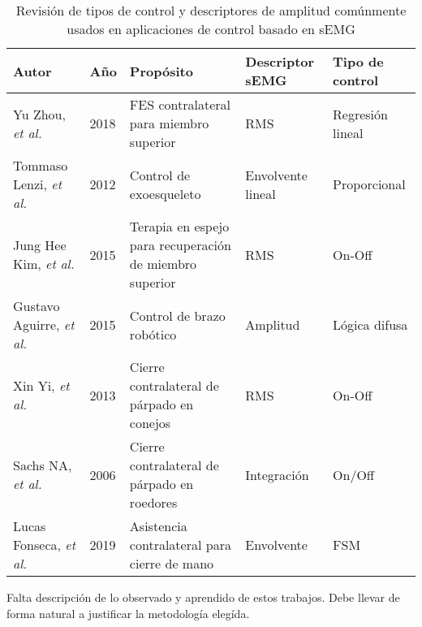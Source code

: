 \begin{table}[htb]
	\centering
	\begin{tabular}{|p{30mm}|p{10mm}|p{45mm}|p{25mm}|p{35mm}|}
	\hline
	\textbf{Autor} & \textbf{Año} & \textbf{Propósito} & \textbf{Descriptor sEMG} & \textbf{Tipo de control}\\
	\hline
	\hline
	Yu Zhou, \emph{et al.} \cite{Zhou2018} & 2018 & FES contralateral para miembro superior & RMS & Regresión lineal\\
	\hline
	Tommaso Lenzi, \emph{et al.} \cite{Lenzi2012} & 2012 & Control de exoesqueleto & Envolvente lineal & Proporcional\\
	\hline
	Jung Hee Kim, \emph{et al.} \cite{Kim2015} & 2015 & Terapia en espejo para recuperación de miembro superior & RMS & On-Off\\
	\hline
	Gustavo Aguirre, \emph{et al.} \cite{Aguirre-Vargas2015} & 2015 & Control de brazo robótico & Amplitud & Lógica difusa\\
	\hline
	Xin Yi, \emph{et al.} \cite{Yi2013} & 2013 & Cierre contralateral de párpado en conejos & RMS & On-Off\\
	\hline
	Sachs NA, \emph{et al.} \cite{Sachs2006} & 2006 & Cierre contralateral de párpado en roedores & Integración & On/Off\\
	\hline
	Lucas Fonseca, \emph{et al.} \cite{Fonseca2019} & 2019 & Asistencia contralateral para cierre de mano & Envolvente & FSM\\
	\hline
	\end{tabular}
	\caption{Revisión de tipos de control y descriptores de amplitud comúnmente usados en aplicaciones de control basado en sEMG}
	\label{Cuadro:Control}
\end{table}

{\color{red}Falta descripción de lo observado y aprendido de estos trabajos. Debe llevar de forma natural a justificar la metodología elegída.}